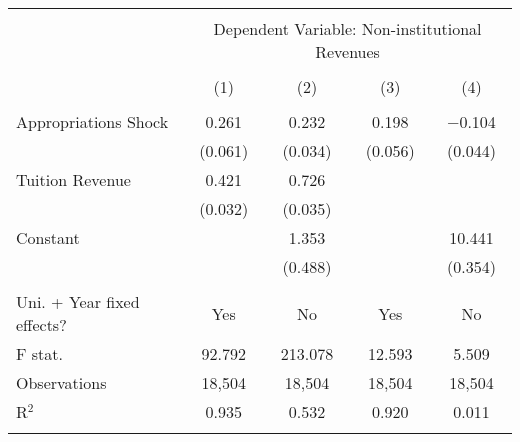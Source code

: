 
\begin{tabular}{@{\extracolsep{5pt}}lcccc} 
\\[-1.8ex]\hline 
\hline \\[-1.8ex] 
 & \multicolumn{4}{c}{Dependent Variable: Non-institutional Revenues} \\ 
\cline{2-5} 
\\[-1.8ex] & (1) & (2) & (3) & (4)\\ 
\hline \\[-1.8ex] 
 Appropriations Shock & 0.261 & 0.232 & 0.198 & $-$0.104 \\ 
  & (0.061) & (0.034) & (0.056) & (0.044) \\ 
  Tuition Revenue & 0.421 & 0.726 &  &  \\ 
  & (0.032) & (0.035) &  &  \\ 
  Constant &  & 1.353 &  & 10.441 \\ 
  &  & (0.488) &  & (0.354) \\ 
 \hline \\[-1.8ex] 
Uni. + Year fixed effects? & Yes & No & Yes & No \\ 
F stat. & 92.792 & 213.078 & 12.593 & 5.509 \\ 
Observations & 18,504 & 18,504 & 18,504 & 18,504 \\ 
R$^{2}$ & 0.935 & 0.532 & 0.920 & 0.011 \\ 
\hline 
\hline \\[-1.8ex] 
\end{tabular} 
